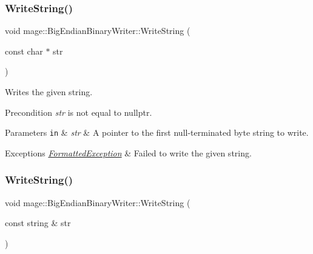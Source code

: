 \subsubsection{\texorpdfstring{Write\+String()}{WriteString()}\hspace{0.1cm}{\footnotesize\ttfamily [1/2]}}
{\footnotesize\ttfamily void mage\+::\+Big\+Endian\+Binary\+Writer\+::\+Write\+String (\begin{DoxyParamCaption}\item[{const char $\ast$}]{str }\end{DoxyParamCaption})\hspace{0.3cm}{\ttfamily [protected]}}

Writes the given string.

\begin{DoxyPrecond}{Precondition}
{\itshape str} is not equal to {\ttfamily nullptr}. 
\end{DoxyPrecond}

\begin{DoxyParams}[1]{Parameters}
\mbox{\tt in}  & {\em str} & A pointer to the first null-\/terminated byte string to write. \\
\hline
\end{DoxyParams}

\begin{DoxyExceptions}{Exceptions}
{\em \hyperlink{structmage_1_1_formatted_exception}{Formatted\+Exception}} & Failed to write the given string. \\
\hline
\end{DoxyExceptions}
\hypertarget{classmage_1_1_big_endian_binary_writer_a0cbee156086deb8999e609a2b355ff0e}{}\label{classmage_1_1_big_endian_binary_writer_a0cbee156086deb8999e609a2b355ff0e} 
\subsubsection{\texorpdfstring{Write\+String()}{WriteString()}\hspace{0.1cm}{\footnotesize\ttfamily [2/2]}}
{\footnotesize\ttfamily void mage\+::\+Big\+Endian\+Binary\+Writer\+::\+Write\+String (\begin{DoxyParamCaption}\item[{const string \&}]{str }\end{DoxyParamCaption})\hspace{0.3cm}{\ttfamily [protected]}}

